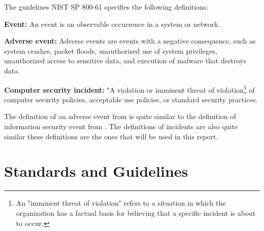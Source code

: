 The guidelines \acs{NIST} SP 800-61 \cite{nist800-61} specifies the following definitions:

\textbf{Event:} An event is an observable occurrence in a system or network.

\textbf{Adverse event:} Adverse events are events with a negative consequence, such as system crashes, packet floods, unauthorized use of system privileges, unauthorized access to sensitive data, and execution of malware that destroys data.

\textbf{Computer security incident:} "A violation or imminent threat of violation\footnote{An "imminent threat of violation" refers to a situation in which the organization has a factual basis for believing that a specific incident is about to occur.} of computer security policies, acceptable use policies, or standard security practices.




The definition of an adverse event from \cite{nist800-61} is quite similar to the definition of information security event from \cite{ISO/IEC27000}. The definitions of incidents are also quite similar these definitions are the ones that will be used in this report.

\section{Standards and Guidelines}


